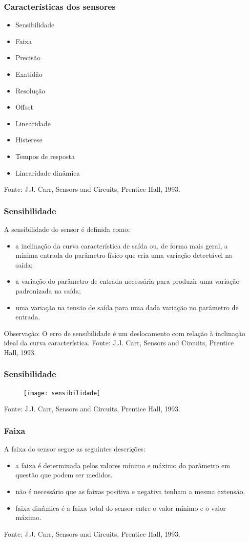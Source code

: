 \documentclass[t]{beamer}
\begin{document}
\begin{frame}
	\frametitle{Características dos sensores}
	\begin{itemize}
		\item Sensibilidade
		\item Faixa
		\item Precisão
		\item Exatidão
		\item Resolução
		\item Offset
		\item Linearidade
		\item Histerese
		\item Tempos de resposta
		\item Linearidade dinâmica
	\end{itemize}
	{\scriptsize Fonte: J.J. Carr, Sensors and Circuits, Prentice Hall, 1993.}
\end{frame}

\begin{frame}
	\frametitle{Sensibilidade}
	A sensibilidade do sensor é definida como:
	 \begin{itemize}
	 	\item a inclinação da curva característica de saída ou, de forma mais geral, a mínima entrada do parâmetro físico que cria uma variação detectável na saída;
	 	\item a variação do parâmetro de entrada necessária para produzir uma variação padronizada na saída;
	 	\item uma variação na tensão de saída para uma dada variação no parâmetro de entrada.
	 \end{itemize}	
 	 Observação: O erro de sensibilidade é um deslocamento com relação à inclinação ideal da curva característica.
	{\scriptsize Fonte: J.J. Carr, Sensors and Circuits, Prentice Hall, 1993.}
\end{frame}

\begin{frame}
	\frametitle{Sensibilidade}
	\begin{figure}
		\texttt{[image: sensibilidade]}
	\end{figure}
	{\scriptsize Fonte: J.J. Carr, Sensors and Circuits, Prentice Hall, 1993.}
\end{frame}

\begin{frame}
	\frametitle{Faixa}
	A faixa do sensor segue as seguintes descrições:
	\begin{itemize}
		\item a faixa é determinada pelos valores mínimo e máximo do parâmetro em questão que podem ser medidos.
		\item não é necessário que as faixas positiva e negativa tenham a mesma extensão.
		\item faixa dinâmica é a faixa total do sensor entre o valor mínimo e o valor máximo.
	\end{itemize}
	{\scriptsize Fonte: J.J. Carr, Sensors and Circuits, Prentice Hall, 1993.}
\end{frame}
\end{document}
